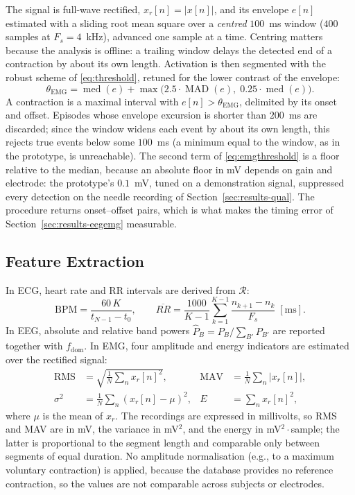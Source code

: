 \documentclass[conference]{IEEEtran}
\begin{document}
The signal is full-wave rectified, $x_r[n]=\lvert x[n]\rvert$, and its envelope $e[n]$ estimated with a sliding root mean square over a \emph{centred} $100$~ms window ($400$ samples at $F_s=4$~kHz), advanced one sample at a time. Centring matters because the analysis is offline: a trailing window delays the detected end of a contraction by about its own length. Activation is then segmented with the robust scheme of \eqref{eq:threshold}, retuned for the lower contrast of the envelope:
\begin{equation}
\theta_{\mathrm{EMG}} = \operatorname{med}(e) + \max\bigl(2.5\cdot\operatorname{MAD}(e),\; 0.25\cdot\operatorname{med}(e)\bigr).
\label{eq:emgthreshold}
\end{equation}
A contraction is a maximal interval with $e[n]>\theta_{\mathrm{EMG}}$, delimited by its onset and offset. Episodes whose envelope excursion is shorter than $200$~ms are discarded; since the window widens each event by about its own length, this rejects true events below some $100$~ms (a minimum equal to the window, as in the prototype, is unreachable). The second term of \eqref{eq:emgthreshold} is a floor relative to the median, because an absolute floor in mV depends on gain and electrode: the prototype's $0.1$~mV, tuned on a demonstration signal, suppressed every detection on the needle recording of Section~\ref{sec:results-qual}. The procedure returns onset--offset pairs, which is what makes the timing error of Section~\ref{sec:results-eegemg} measurable.

\subsection{Feature Extraction}
\label{sec:features}

In ECG, heart rate and RR intervals are derived from $\mathcal{R}$:
\begin{equation}
\mathrm{BPM} = \frac{60\,K}{t_{N-1}-t_0}, \qquad
\overline{RR} = \frac{1000}{K-1}\sum_{k=1}^{K-1}\frac{n_{k+1}-n_k}{F_s}\;[\mathrm{ms}].
\label{eq:bpm}
\end{equation}
In EEG, absolute and relative band powers $\hat{P}_B = P_B/\sum_{B'}P_{B'}$ are reported together with $f_{\mathrm{dom}}$. In EMG, four amplitude and energy indicators are estimated over the rectified signal:
\begin{align}
\mathrm{RMS} &= \sqrt{\tfrac{1}{N}\textstyle\sum_{n} x_r[n]^2}, &
\mathrm{MAV} &= \tfrac{1}{N}\textstyle\sum_{n} |x_r[n]|, \label{eq:emg1}\\
\sigma^2 &= \tfrac{1}{N}\textstyle\sum_{n} (x_r[n]-\mu)^2, &
E &= \textstyle\sum_{n} x_r[n]^2, \label{eq:emg2}
\end{align}
where $\mu$ is the mean of $x_r$. The recordings are expressed in millivolts, so RMS and MAV are in mV, the variance in mV$^2$, and the energy in mV$^2\cdot$sample; the latter is proportional to the segment length and comparable only between segments of equal duration. No amplitude normalisation (e.g., to a maximum voluntary contraction) is applied, because the database provides no reference contraction, so the values are not comparable across subjects or electrodes.
\end{document}
